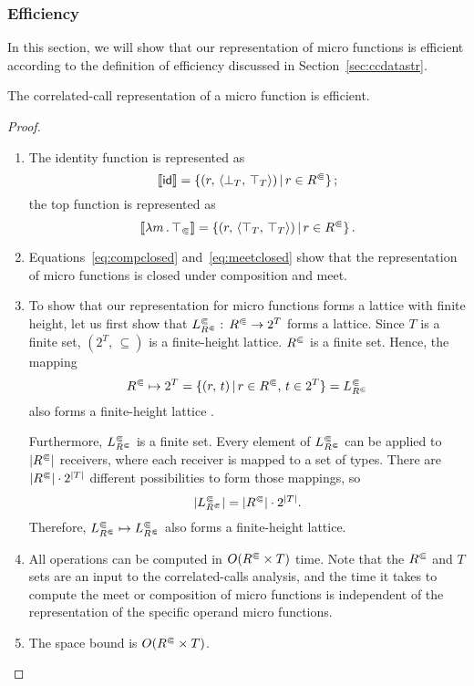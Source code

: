 \subsubsection{Efficiency}\label{sec:efficiency}
In this section, we will show that our representation of micro functions is efficient according to the definition  of efficiency discussed in Section~\ref{sec:ccdatastr}.
\begin{lemma}\label{lem:efficient}
  The correlated-call representation of a micro function is efficient.
\end{lemma}
\begin{proof}
\leavevmode
  \begin{enumerate}
    \item The identity function is represented as
      \[
        \left\llbracket\textsf{id}\right\rrbracket=\{(r,\,\langle \bot_T,\,\top_T\rangle)\,|\,r\in {R^\Subset}\}\,;
      \]
      the top function is represented as
      \[
        \left\llbracket\lambda m\,.\,\top_\Subset\right\rrbracket=\{(r,\,\langle \top_T,\,\top_T\rangle)\,|\,r\in {R^\Subset}\}\,.
      \]
    \item Equations~\eqref{eq:compclosed} and~\eqref{eq:meetclosed} show that the representation of micro functions is closed under composition and meet.
    \item To show that our representation for micro functions forms a lattice with finite height, let us first show that $L^\Subset_{R^\Subset}:\,{R^\Subset}\to2^T$ forms a lattice. Since $T$ is a finite set, $(2^T,\,\subseteq)$ is a finite-height lattice. ${R^\Subset}$ is a finite set. Hence, the mapping
    \[
      {R^\Subset}\mapsto2^T=\{(r,\,t)\,|\,r\in {R^\Subset},\,t\in 2^T\}=L^\Subset_{R^\Subset}
    \]        
    also forms a finite-height lattice \cite{nielson1999principles}. 
    
    Furthermore, $L^\Subset_{R^\Subset}$ is a finite set. 
    Every element of $L^\Subset_{R^\Subset}$ can be applied to $|{R^\Subset}|$ receivers, where each receiver is mapped to a set of types. There are $|{R^\Subset}|\cdot2^{|T|}$ different possibilities to form those mappings, so
    \[
      |L^\Subset_{R^\Subset}|=|{R^\Subset}|\cdot2^{|T|}.
    \]
    Therefore, $L^\Subset_{R^\Subset}\mapsto L^\Subset_{R^\Subset}$ also forms a finite-height lattice.
    \item All operations can be computed in $O({R^\Subset}\times T)$ time. Note that the ${R^\Subset}$ and $T$ sets are an input to the correlated-calls analysis, and the time it takes to compute the meet or composition of micro functions is independent of the representation of the specific operand micro functions.
    \item The space bound is $O({R^\Subset}\times T)$.
  \end{enumerate}
\end{proof}

